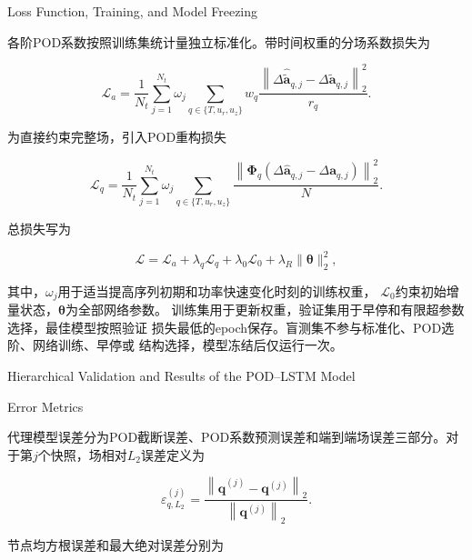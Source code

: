 {Loss Function, Training, and Model Freezing}

各阶POD系数按照训练集统计量独立标准化。带时间权重的分场系数损失为

\begin{equation}
	\mathcal L_a
	=
	\frac{1}{N_t}
	\sum_{j=1}^{N_t}
	\omega_j
	\sum_{q\in\{T,u_r,u_z\}}
	w_q
	\frac{
		\left\|
		\Delta\widehat{\widetilde{\boldsymbol a}}_{q,j}
		-
		\Delta\widetilde{\boldsymbol a}_{q,j}
		\right\|_2^2
	}{r_q}.
	\label{eq:formal_lstm_coefficient_loss}
\end{equation}

为直接约束完整场，引入POD重构损失

\begin{equation}
	\mathcal L_q
	=
	\frac{1}{N_t}
	\sum_{j=1}^{N_t}
	\omega_j
	\sum_{q\in\{T,u_r,u_z\}}
	\frac{
		\left\|
		\boldsymbol\Phi_q
		\left(
		\Delta\widehat{\boldsymbol a}_{q,j}
		-
		\Delta\boldsymbol a_{q,j}
		\right)
		\right\|_2^2
	}{N}.
	\label{eq:formal_lstm_field_loss}
\end{equation}

总损失写为

\begin{equation}
	\mathcal L
	=
	\mathcal L_a
	+
	\lambda_q\mathcal L_q
	+
	\lambda_0\mathcal L_0
	+
	\lambda_R\|\boldsymbol\theta\|_2^2,
	\label{eq:formal_lstm_total_loss}
\end{equation}

其中，$\omega_j$用于适当提高序列初期和功率快速变化时刻的训练权重，
$\mathcal L_0$约束初始增量状态，$\boldsymbol\theta$为全部网络参数。
训练集用于更新权重，验证集用于早停和有限超参数选择，最佳模型按照验证
损失最低的epoch保存。盲测集不参与标准化、POD选阶、网络训练、早停或
结构选择，模型冻结后仅运行一次。

{Hierarchical Validation and Results of the POD--LSTM Model}

{Error Metrics}

代理模型误差分为POD截断误差、POD系数预测误差和端到端场误差三部分。对于第$j$个快照，场相对$L_2$误差定义为

\begin{equation}
	\varepsilon_{q,L_2}^{(j)}
	=
	\frac{
		\left\|
		\widehat{\boldsymbol{q}}^{(j)}
		-\boldsymbol{q}^{(j)}
		\right\|_2
	}{
		\left\|\boldsymbol{q}^{(j)}\right\|_2
	}.
	\label{eq:surrogate_relative_l2_complete}
\end{equation}

节点均方根误差和最大绝对误差分别为

